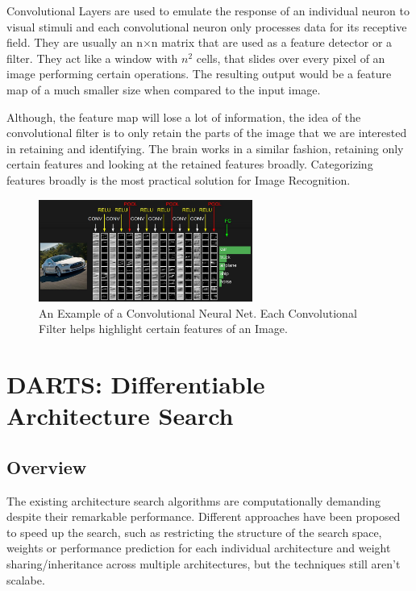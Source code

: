 \documentclass{ieee}
\begin{document}
Convolutional Layers are used to emulate the response of an individual neuron to visual stimuli and each convolutional neuron only processes data for its receptive field. They are usually an n$\times$n matrix that are used as a feature detector or a filter. They act like a window with $n^2$ cells, that slides over every pixel of an image  performing certain operations. The resulting output would be a feature map of a much smaller size when compared to the input image. 

Although, the feature map will lose a lot of information, the idea of the convolutional filter is to only retain the parts of the image that we are interested in retaining and identifying.
 The brain works in a similar fashion, retaining only certain features and looking at the retained features broadly. Categorizing features broadly is the most practical solution for Image Recognition.
 \begin{figure}[h]
    \begin{center}
    \includegraphics[width=7cm]{images/convnet.jpeg}
    \end{center}
    \label{mbconv_fig}
    \caption{An Example of a Convolutional Neural Net. Each Convolutional Filter helps highlight certain features of an Image. \cite{CONVNETIMAGE}}
\end{figure}

\section{DARTS: Differentiable Architecture Search}
\subsection{Overview}
The existing architecture search algorithms are computationally demanding despite their remarkable performance. Different approaches have been proposed to speed up the search, such as restricting the structure of the search space, weights or performance prediction for each individual architecture and weight sharing/inheritance across multiple architectures, but the techniques still aren't scalabe. 
\end{document}
